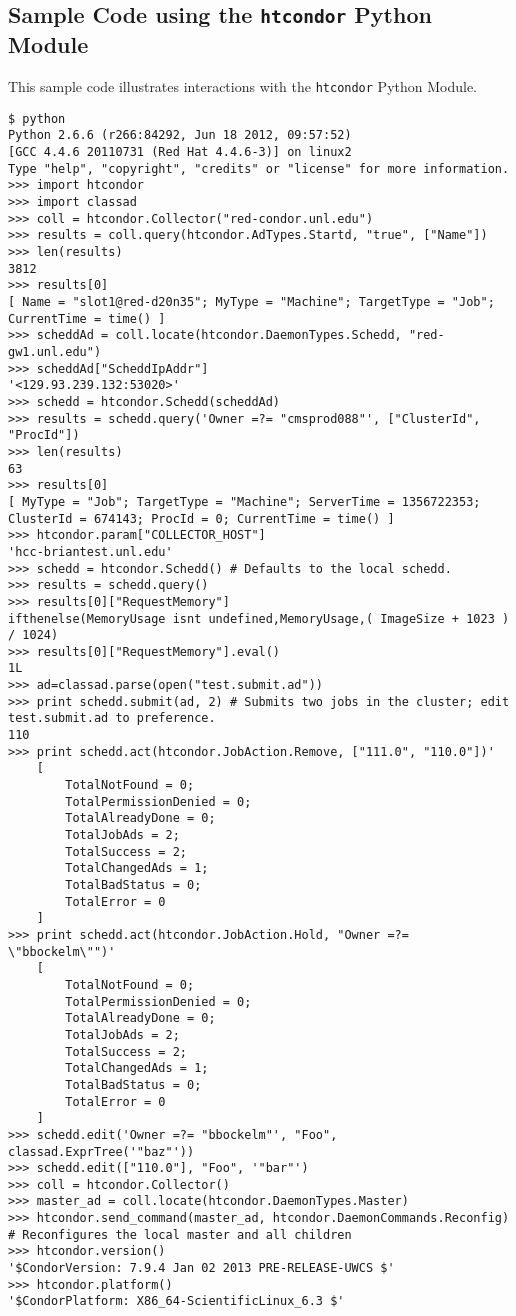 \subsection{\label{Python-Example} Sample Code using the \texttt{htcondor} Python Module}
This sample code illustrates interactions with the \texttt{htcondor} Python Module. 

\footnotesize
\begin{verbatim}
$ python
Python 2.6.6 (r266:84292, Jun 18 2012, 09:57:52) 
[GCC 4.4.6 20110731 (Red Hat 4.4.6-3)] on linux2
Type "help", "copyright", "credits" or "license" for more information.
>>> import htcondor
>>> import classad
>>> coll = htcondor.Collector("red-condor.unl.edu")
>>> results = coll.query(htcondor.AdTypes.Startd, "true", ["Name"])
>>> len(results)
3812
>>> results[0]
[ Name = "slot1@red-d20n35"; MyType = "Machine"; TargetType = "Job"; CurrentTime = time() ]
>>> scheddAd = coll.locate(htcondor.DaemonTypes.Schedd, "red-gw1.unl.edu")
>>> scheddAd["ScheddIpAddr"]
'<129.93.239.132:53020>'
>>> schedd = htcondor.Schedd(scheddAd)
>>> results = schedd.query('Owner =?= "cmsprod088"', ["ClusterId", "ProcId"])
>>> len(results)
63
>>> results[0]
[ MyType = "Job"; TargetType = "Machine"; ServerTime = 1356722353; ClusterId = 674143; ProcId = 0; CurrentTime = time() ]
>>> htcondor.param["COLLECTOR_HOST"]
'hcc-briantest.unl.edu'
>>> schedd = htcondor.Schedd() # Defaults to the local schedd.
>>> results = schedd.query()
>>> results[0]["RequestMemory"]
ifthenelse(MemoryUsage isnt undefined,MemoryUsage,( ImageSize + 1023 ) / 1024)
>>> results[0]["RequestMemory"].eval()
1L
>>> ad=classad.parse(open("test.submit.ad"))
>>> print schedd.submit(ad, 2) # Submits two jobs in the cluster; edit test.submit.ad to preference.
110
>>> print schedd.act(htcondor.JobAction.Remove, ["111.0", "110.0"])'
    [
        TotalNotFound = 0; 
        TotalPermissionDenied = 0; 
        TotalAlreadyDone = 0; 
        TotalJobAds = 2; 
        TotalSuccess = 2; 
        TotalChangedAds = 1; 
        TotalBadStatus = 0; 
        TotalError = 0
    ]
>>> print schedd.act(htcondor.JobAction.Hold, "Owner =?= \"bbockelm\"")'
    [
        TotalNotFound = 0; 
        TotalPermissionDenied = 0; 
        TotalAlreadyDone = 0; 
        TotalJobAds = 2; 
        TotalSuccess = 2; 
        TotalChangedAds = 1; 
        TotalBadStatus = 0; 
        TotalError = 0
    ]
>>> schedd.edit('Owner =?= "bbockelm"', "Foo", classad.ExprTree('"baz"'))
>>> schedd.edit(["110.0"], "Foo", '"bar"')
>>> coll = htcondor.Collector()
>>> master_ad = coll.locate(htcondor.DaemonTypes.Master)
>>> htcondor.send_command(master_ad, htcondor.DaemonCommands.Reconfig) # Reconfigures the local master and all children
>>> htcondor.version()
'$CondorVersion: 7.9.4 Jan 02 2013 PRE-RELEASE-UWCS $'
>>> htcondor.platform()
'$CondorPlatform: X86_64-ScientificLinux_6.3 $'

\end{verbatim}
\normalsize

